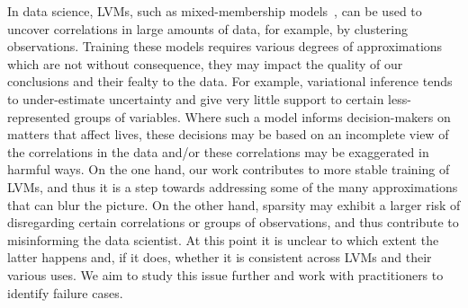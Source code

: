 In data science, LVMs, such as
mixed-membership models~\citep{blei2014build}, can be used to uncover
correlations in large amounts of data, for example, by clustering
observations. Training these models requires various degrees of
approximations which are not without consequence, they may impact the
quality of our conclusions and their fealty to the data. For example,
variational inference tends to under-estimate uncertainty and give
very little support to certain less-represented groups of variables.
Where such a model informs decision-makers on matters that affect
lives, these decisions may be based on an incomplete view of the
correlations in the data and/or these correlations may be exaggerated
in harmful ways. On the one hand, our work contributes to more stable
training of LVMs, and thus it is a step towards addressing some of
the many approximations that can blur the picture. On the other hand,
sparsity may exhibit a larger risk of disregarding certain
correlations or groups of observations, and thus contribute to
misinforming the data scientist. At this point it is unclear to which
extent the latter happens and, if it does, whether it is consistent
across LVMs and their various uses. We aim to study this issue
further and work with practitioners to identify failure cases.

\cleardoublepage

\singlespacing